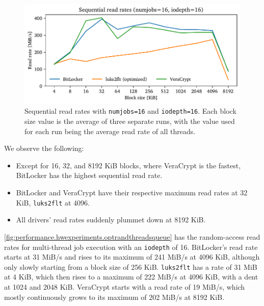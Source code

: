 \begin{figure}[htb!]
	\center
	\includegraphics[scale=1]{../fig/performance.hwexperiments.optseqthreadsqueue.pdf}
	\caption[
		Sequential read rates with \texttt{numjobs=16} and \texttt{iodepth=16}
	]{
		Sequential read rates with \texttt{numjobs=16} and \texttt{iodepth=16}. Each block size value is the average of three separate runs, with the value used for each run being the average read rate of all threads.
	}
	\label{fig:performance.hwexperiments.optseqthreadsqueue}
\end{figure}

We observe the following:
\begin{itemize}
	\item Except for 16, 32, and 8192 KiB blocks, where VeraCrypt is the fastest, BitLocker has the highest sequential read rate.
	\item BitLocker and VeraCrypt have their respective maximum read rates at 32 KiB, \texttt{luks2flt} at 4096.
	\item All drivers' read rates suddenly plummet down at 8192 KiB.
\end{itemize}

\autoref{fig:performance.hwexperiments.optrandthreadsqueue} has the random-access read rates for multi-thread job execution with an \texttt{iodepth} of 16. BitLocker's read rate starts at 31 MiB/s and rises to its maximum of 241 MiB/s at 4096 KiB, although only slowly starting from a block size of 256 KiB. \texttt{luks2flt} has a rate of 31 MiB at 4 KiB, which then rises to a maximum of 222 MiB/s at 4096 KiB, with a dent at 1024 and 2048 KiB. VeraCrypt starts with a read rate of 19 MiB/s, which mostly continuously grows to its maximum of 202 MiB/s at 8192 KiB.

